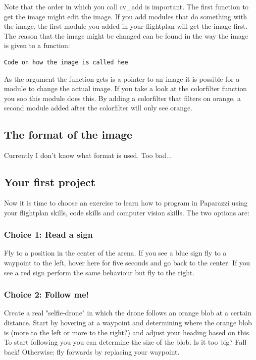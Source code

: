 \documentclass{article}
\begin{document}
Note that the order in which you call cv\_add is important. The first function to get the image might edit the image. If you add modules that do something with the image, the first module you added in your flightplan will get the image first. The reason that the image might be changed can be found in the way the image is given to a function: 
\begin{verbatim}
Code on how the image is called hee
\end{verbatim}
As the argument the function gets is a pointer to an image it is possible for a module to change the actual image. If you take a look at the colorfilter function you soo this module does this. By adding a colorfilter that filters on orange, a second module added after the colorfilter will only see orange. 

\subsection*{The format of the image}
Currently I don't know what format is used. Too bad...

\subsection*{Your first project}
Now it is time to choose an exercise to learn how to program in Paparazzi using your flightplan skills, code skills and computer vision skills. The two options are:

\subsubsection*{Choice 1: Read a sign}
Fly to a position in the center of the arena. If you see a blue sign fly to a waypoint to the left, hover here for five seconds and go back to the center. If you see a red sign perform the same behaviour but fly to the right. 

\subsubsection*{Choice 2: Follow me!}
Create a real "selfie-drone" in which the drone follows an orange blob at a certain distance. 
Start by hovering at a waypoint and determining where the orange blob is (more to the left or more to the right?) and adjust your heading based on this. 
To start following you you can determine the size of the blob. Is it too big? Fall back! Otherwise: fly forwards by replacing your waypoint.
\end{document}
